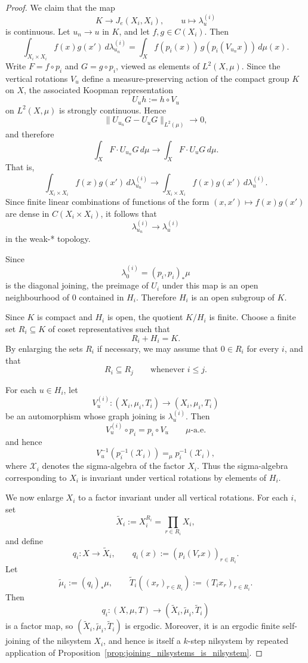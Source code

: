 \documentclass[12pt]{amsart}
\theoremstyle{plain}
\theoremstyle{definition}
\begin{document}
\begin{proof}
    We claim that the map
\[
K \to J_e(X_i,X_i), \qquad u \mapsto \lambda_u^{(i)}
\]
is continuous.
Let $u_n \to u$ in $K$, and let $f,g \in C(X_i)$.
Then
\[
\int_{X_i\times X_i} f(x)g(x')\, d\lambda^{(i)}_{u_n}
=
\int_X f(p_i(x))\, g(p_i(V_{u_n}x))\, d\mu(x).
\]
Write $F = f\circ p_i$ and $G = g\circ p_i$, viewed as elements of $L^2(X,\mu)$.
Since the vertical rotations $V_u$ define a measure-preserving action of the compact group $K$ on $X$, the associated Koopman representation
\[
U_u h := h\circ V_u
\]
on $L^2(X,\mu)$ is strongly continuous.
Hence
\[
\|U_{u_n}G - U_uG\|_{L^2(\mu)} \to 0,
\]
and therefore
\[
\int_X F \cdot U_{u_n}G \, d\mu \to \int_X F \cdot U_uG \, d\mu.
\]
That is,
\[
\int_{X_i\times X_i} f(x)g(x')\, d\lambda^{(i)}_{u_n}
\to
\int_{X_i\times X_i} f(x)g(x')\, d\lambda^{(i)}_u.
\]
Since finite linear combinations of functions of the form $(x,x')\mapsto f(x)g(x')$ are dense in $C(X_i\times X_i)$, it follows that
\[
\lambda^{(i)}_{u_n} \to \lambda^{(i)}_u
\]
in the weak-* topology.

    Since
    \[
    \lambda_0^{(i)}=(p_i,p_i)_*\mu
    \]
    is the diagonal joining, the preimage of $U_i$ under this map is an open neighbourhood of $0$ contained in $H_i$.
    Therefore $H_i$ is an open subgroup of $K$.

    Since $K$ is compact and $H_i$ is open, the quotient $K/H_i$ is finite.
    Choose a finite set $R_i\subseteq K$ of coset representatives such that
    \[
    R_i+H_i=K.
    \]
    By enlarging the sets $R_i$ if necessary, we may assume that $0\in R_i$ for every $i$, and that
    \[
    R_i\subseteq R_j \qquad \text{whenever } i\leq j.
    \]

    For each $u\in H_i$, let
    \[
    V_u^{(i)}\colon (X_i,\mu_i,T_i)\to (X_i,\mu_i,T_i)
    \]
    be an automorphism whose graph joining is $\lambda_u^{(i)}$.
    Then
    \[
    V_u^{(i)}\circ p_i=p_i\circ V_u \qquad \mu\text{-a.e.}
    \]
    and hence
    \[
    V_u^{-1}(p_i^{-1}(\mathcal X_i)) =_\mu p_i^{-1}(\mathcal X_i),
    \]
    where $\mathcal X_i$ denotes the sigma-algebra of the factor $X_i$.
    Thus the sigma-algebra corresponding to $X_i$ is invariant under vertical rotations by elements of $H_i$.

    We now enlarge $X_i$ to a factor invariant under all vertical rotations.
    For each $i$, set
    \[
    \widetilde X_i:=X_i^{R_i}=\prod_{r\in R_i} X_i,
    \]
    and define
    \[
    q_i\colon X\to \widetilde X_i,\qquad
    q_i(x):=(p_i(V_r x))_{r\in R_i}.
    \]
    Let
    \[
    \widetilde\mu_i:=(q_i)_*\mu,
    \qquad
    \widetilde T_i((x_r)_{r\in R_i}):=(T_i x_r)_{r\in R_i}.
    \]
    Then
    \[
    q_i\colon (X,\mu,T)\to (\widetilde X_i,\widetilde\mu_i,\widetilde T_i)
    \]
    is a factor map, so $(\widetilde X_i,\widetilde\mu_i,\widetilde T_i)$ is ergodic.
    Moreover, it is an ergodic finite self-joining of the nilsystem $X_i$, and hence is itself a $k$-step nilsystem by repeated application of Proposition~\ref{prop:joining_nilsystems_is_nilsystem}.


\end{proof}
\end{document}
